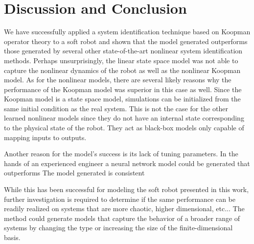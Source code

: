 \section{Discussion and Conclusion}
\label{sec:conclusion}

We have successfully applied a system identification technique based on Koopman operator theory to a soft robot and shown that the model generated outperforms those generated by several other state-of-the-art nonlinear system identification methods.
Perhaps unsurprisingly, the linear state space model was not able to capture the nonlinear dynamics of the robot as well as the nonlinear Koopman model.
As for the nonlinear models, there are several likely reasons why the performance of the Koopman model was superior in this case as well.
Since the Koopman model is a state space model, simulations can be initialized from the same initial condition as the real system.
This is not the case for the other learned nonlinear models since they do not have an internal state corresponding to the physical state of the robot.
They act as black-box models only capable of mapping inputs to outputs.

Another reason for the model's success is its lack of tuning parameters.
In the hands of an experienced engineer a neural network model could be generated that outperforms 
The model generated is consistent 


While this has been successful for modeling the soft robot presented in this work, further investigation is required to determine if the same performance can be readily realized on systems that are more chaotic, higher dimensional, etc...
The method could generate models that capture the behavior of a broader range of systems by changing the type or increasing the size of the finite-dimensional basis.



